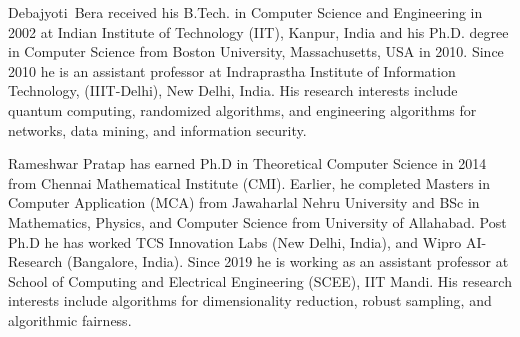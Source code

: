 \documentclass[10pt,journal,compsoc]{IEEEtran}
\begin{document}







\begin{IEEEbiography}{Debajyoti~Bera}
received his B.Tech. in Computer Science and Engineering in 2002 at Indian Institute of Technology (IIT), Kanpur, India and his Ph.D. degree in Computer Science from Boston University, Massachusetts, USA in 2010. Since 2010 he is an assistant professor at Indraprastha Institute of Information Technology, (IIIT-Delhi), New Delhi, India.
His research interests include quantum computing, randomized algorithms, and engineering algorithms for networks, data mining, and information security.
\end{IEEEbiography}
\vspace{-4mm}

\begin{IEEEbiography}{Rameshwar Pratap}
 has earned Ph.D in Theoretical Computer Science in 2014  from Chennai Mathematical Institute (CMI). Earlier, he completed Masters in Computer Application (MCA) from  Jawaharlal Nehru University and   BSc in Mathematics, Physics, and Computer Science from University of Allahabad. Post Ph.D he has worked  TCS Innovation Labs (New Delhi, India),  and Wipro AI-Research (Bangalore, India). Since 2019 he is working as an assistant professor at School of Computing and Electrical Engineering (SCEE), IIT Mandi. His research interests include algorithms for dimensionality reduction,  robust sampling, and algorithmic fairness. %
 \end{IEEEbiography}
 
\end{document}
